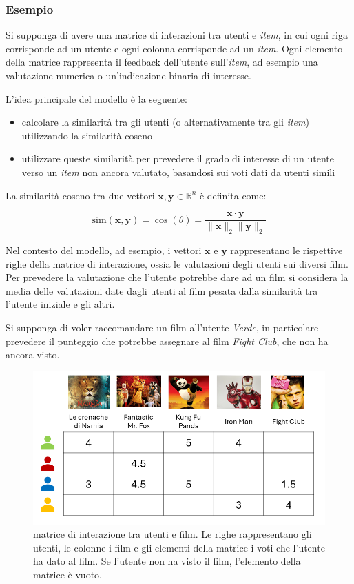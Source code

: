 \subsubsection{Esempio}

Si supponga di avere una matrice di interazioni tra utenti e \textit{item}, in cui ogni riga corrisponde ad un utente e ogni colonna corrisponde ad un \textit{item}. Ogni elemento della matrice rappresenta il feedback dell'utente sull'\textit{item}, ad esempio una valutazione numerica o un'indicazione binaria di interesse.

L'idea principale del modello è la seguente:

\begin{itemize}
    \item calcolare la similarità tra gli utenti (o alternativamente tra gli \textit{item}) utilizzando la similarità coseno
    \item utilizzare queste similarità per prevedere il grado di interesse di un utente verso un \textit{item} non ancora valutato, basandosi sui voti dati da utenti simili
\end{itemize}

La similarità coseno tra due vettori \( \mathbf{x}, \mathbf{y} \in \mathbb{R}^n \) è definita come:

\[
\text{sim}(\mathbf{x}, \mathbf{y}) = \cos(\theta) = \frac{\mathbf{x} \cdot \mathbf{y}}{\|\mathbf{x}\|_2 \|\mathbf{y}\|_2}
\]

Nel contesto del modello, ad esempio, i vettori \( \mathbf{x} \) e \( \mathbf{y} \) rappresentano le rispettive righe della matrice di interazione, ossia le valutazioni degli utenti sui diversi film. Per prevedere la valutazione che l'utente potrebbe dare ad un film si considera la media delle valutazioni date dagli utenti al film pesata dalla similarità tra l'utente iniziale e gli altri.

Si supponga di voler raccomandare un film all'utente \textit{Verde}, in particolare prevedere il punteggio che potrebbe assegnare al film \textit{Fight Club}, che non ha ancora visto.

\begin{figure}[htbp]
    \centering
    \includegraphics[scale=0.5]{figures/collaborative_filtering/interaction_matrix.png}
    \caption{matrice di interazione tra utenti e film. Le righe rappresentano gli utenti, le colonne i film e gli elementi della matrice i voti che l'utente ha dato al film. Se l'utente non ha visto il film, l'elemento della matrice è vuoto.}
\end{figure}

